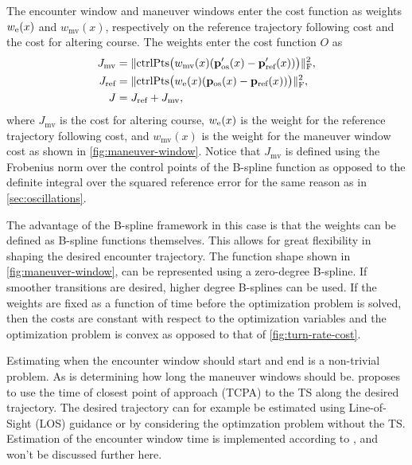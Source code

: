 The encounter window and maneuver windows enter the cost function as weights $w_\text e(x)$ and $w_\text{mv}(x)$, respectively on the reference trajectory following cost and the cost for altering course. The weights enter the cost function $O$ as
\begin{subequations}\label{eq:cost-maneuver-window}
    \begin{align}
        J_\text{mv} &= \|\text{ctrlPts}\big(w_\text{mv}(x)(\mathbf p'_\text{os}(x) - \mathbf p'_\text{ref}(x))\big)\|_\text{F}^2, \label{eq:cost-maneuver-window-mv}\\
        J_\text{ref} &= \|\text{ctrlPts}\big(w_\text e(x)(\mathbf p_\text{os}(x) - \mathbf p_\text{ref}(x))\big)\|_\text{F}^2, \label{eq:cost-maneuver-window-ref}\\
        J &= J_\text{ref} + J_\text{mv}, \label{eq:cost-maneuver-window-total}
    \end{align}
\end{subequations}
where $J_\text{mv}$ is the cost for altering course, $w_\text e(x)$ is the weight for the reference trajectory following cost, and $w_\text{mv}(x)$ is the weight for the maneuver window cost as shown in \cref{fig:maneuver-window}. Notice that $J_\text{mv}$ is defined using the Frobenius norm over the control points of the B-spline function as opposed to the definite integral over the squared reference error for the same reason as in \cref{sec:oscillations}.

The advantage of the B-spline framework in this case is that the weights can be defined as B-spline functions themselves. This allows for great flexibility in shaping the desired encounter trajectory. The function shape shown in \cref{fig:maneuver-window}, can be represented using a zero-degree B-spline. If smoother transitions are desired, higher degree B-splines can be used.
If the weights are fixed as a function of time before the optimization problem is solved, then the costs are constant with respect to the optimization variables and the optimization problem is convex as opposed to that of \cref{fig:turn-rate-cost}.

Estimating when the encounter window should start and end is a non-trivial problem. As is determining how long the maneuver windows should be. \cite{Thyri2022-MPC} proposes to use the time of closest point of approach (TCPA) to the TS along the desired trajectory. The desired trajectory can for example be estimated using Line-of-Sight (LOS) guidance \citep{Fossen2011-Handbook} or by considering the optimzation problem without the TS. Estimation of the encounter window time is implemented according to \cite{Thyri2022-MPC}, and won't be discussed further here.


